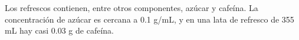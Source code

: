 \question[20] Los refrescos contienen, entre otros componentes, azúcar y cafeína. 
La concentración de azúcar es cercana a 0.1 g/mL, y en una lata de refresco de 355 mL hay casi 0.03 g de cafeína.

\begin{parts}
    
    
\end{parts}